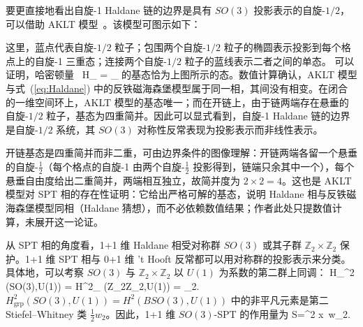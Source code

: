 要更直接地看出自旋-1 Haldane 链的边界是具有 $SO(3)$ 投影表示的自旋-$1/2$，可以借助 AKLT 模型~\cite{affleck2004rigorous}。该模型可图示如下：
\begin{center}
\end{center}
这里，蓝点代表自旋-$1/2$ 粒子；包围两个自旋-$1/2$ 粒子的椭圆表示投影到每个格点上的自旋-1 三重态；连接两个自旋-$1/2$ 粒子的蓝线表示二者之间的单态。
可以证明，哈密顿量~\cite{affleck2004rigorous}
\be
H_ = \sum_{} 
\ee
的基态恰为上图所示的态。数值计算确认，AKLT 模型与式~(\ref{eq:Haldane}) 中的反铁磁海森堡模型属于同一相，其间没有相变。在闭合的一维空间环上，AKLT 模型的基态唯一；而在开链上，由于链两端存在悬垂的自旋-$1/2$ 粒子，基态为四重简并。因此可以显式看到，自旋-1 Haldane 链的边界是自旋-$1/2$ 系统，其 $SO(3)$ 对称性反常表现为投影表示而非线性表示。

\begin{yizhu}
开链基态是四重简并而非二重，可由边界条件的图像理解：开链两端各留一个悬垂的自旋-$\frac{1}{2}$（每个格点的自旋-1 由两个自旋-$\frac{1}{2}$ 投影得到，链端只余其中一个），每个悬垂自由度给出二重简并，两端相互独立，故简并度为 $2\times 2=4$。这也是 AKLT 模型对 SPT 相的存在性证明：它给出严格可解的基态，说明 Haldane 相与反铁磁海森堡模型同相（Haldane 猜想），而不必依赖数值结果；作者此处只提数值计算，未展开这一论证。
\end{yizhu}

从 SPT 相的角度看，1+1 维 Haldane 相受对称群 $SO(3)$ 或其子群 $\mathbb{Z}_2 \times \mathbb{Z}_2$ 保护。1+1 维 SPT 相与 0+1 维 't Hooft 反常都可以用对称群的投影表示来分类。具体地，可以考察 $SO(3)$ 与 $\mathbb{Z}_2 \times \mathbb{Z}_2$ 以 $U(1)$ 为系数的第二群上同调：
\be  H_^2 (SO(3),U(1)) = H^2_ (\mathbb Z_2\times\mathbb Z_2,U(1)) = \bbZ_2. \ee
$H_{\text{grp}}^2 (SO(3),U(1)) = H^2(BSO(3),U(1)) $ 中的非平凡元素是第二 Stiefel--Whitney 类 $\frac{1}{2}w_2$。因此，1+1 维 $SO(3)$-SPT 的作用量为
\be
S=\int \dd^2 x\ w_2.
\ee

